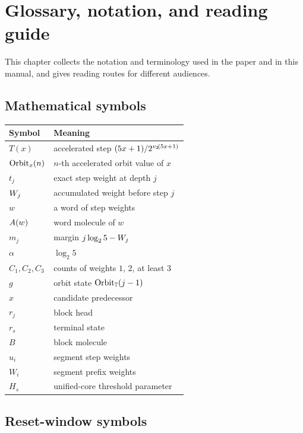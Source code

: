 \section{Glossary, notation, and reading guide}

This chapter collects the notation and terminology used in the paper
and in this manual, and gives reading routes for different audiences.

\subsection{Mathematical symbols}

\begin{center}
\small
\begin{tabular}{@{}p{}p{}@{}}
\toprule
Symbol & Meaning \\
\midrule
$T(x)$ & accelerated step $(5x+1)/2^{v_2\!\left(5x+1\right)}$ \\
$\mathrm{Orbit}_x(n)$ & $n$-th accelerated orbit value of $x$ \\
$t_j$ & exact step weight at depth $j$ \\
$W_j$ & accumulated weight before step $j$ \\
$w$ & a word of step weights \\
$A(w)$ & word molecule of $w$ \\
$m_j$ & margin $j\log_2 5-W_j$ \\
$\alpha$ & $\log_2 5$ \\
$C_1,C_2,C_3$ & counts of weights $1$, $2$, at least $3$ \\
$g$ & orbit state $\mathrm{Orbit}_7(j-1)$ \\
$x$ & candidate predecessor \\
$r_j$ & block head \\
$r_s$ & terminal state \\
$B$ & block molecule \\
$u_i$ & segment step weights \\
$W_i$ & segment prefix weights \\
$H_s$ & unified-core threshold parameter \\
\bottomrule
\end{tabular}
\end{center}

\subsection{Reset-window symbols}

